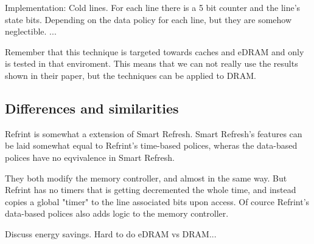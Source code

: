 Implementation: Cold lines. For each line there is a 5 bit counter and the line's state bits. Depending on the data policy  for each line, but they are somehow neglectible.  ...

Remember that this technique is targeted towards caches and eDRAM and only is tested in that enviroment. This means that we can not really use the results shown in their paper, but the techniques can be applied to DRAM.

\subsection{Differences and similarities}

Refrint is somewhat a extension of Smart Refresh. Smart Refresh's features can be laid somewhat equal to Refrint's time-based polices, wheras the data-based polices have no eqvivalence in Smart Refresh.

They both modify the memory controller, and almost in the same way. But Refrint has no timers that is getting decremented the whole time, and instead copies a global "timer" to the line associated bits upon access. Of cource Refrint's data-based polices also adds logic to the memory controller.

Discuss energy savings. Hard to do eDRAM vs DRAM...

